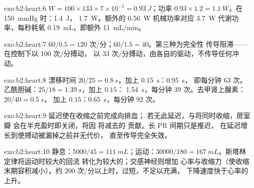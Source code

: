 \begin{solution}{exo:b2:heart:6}
$W = 100\times 133\times 7\times 10^{-5} = \qty{0.93}{J}$；功率
$0.93\times 1.2 = \qty{1.1}{W}$。在 \qty{150}{mmHg} 时：\qty{1.4}{J}，
\qty{1.7}{W}。额外的 \qty{0.56}{W} 机械功率对应
\qty{3.7}{W} 代谢功率，每秒耗氧 \qty{0.19}{mL}，即额外 \qty{11}{mL/min}。
\end{solution}

\begin{solution}{exo:b2:heart:7}
$60/0.5 = 120$ 次/分；$60/1.5 = 40$。第三种为完全性
传导阻滞——在控制下以 100 次/分搏动，
以 33 次/分搏动，由各自的驱动，不传导任何冲动。
\end{solution}

\begin{solution}{exo:b2:heart:8}
漂移时间 $20/25 = \qty{0.8}{s}$，加上 \qty{0.15}{s}：\qty{0.95}{s}，
即每分钟 63 次。乙酰胆碱：$25/18 = \qty{1.39}{s}$，加上 $0.15$：
\qty{1.54}{s}，每分钟 39 次。去甲肾上腺素：$20/40 = \qty{0.5}{s}$，
加上 $0.15$：\qty{0.65}{s}，每分钟 92 次。
\end{solution}

\begin{solution}{exo:b2:heart:9}
延迟使在收缩之前完成向排血；
若无此延迟，与将同时收缩，房室瓣
会在半充盈时即关闭，将因
将减去的
贡献。长 PR 间期只是推迟，
在延迟增长到使搏动被漏掉之前并无代价，
直至传导完全失效。
\end{solution}

\begin{solution}{exo:b2:heart:10}
静息：$5000/45 = \qty{111}{mL}$；运动：$\num{30000}/180 =
\qty{167}{mL}$。斯塔林定律将运动时较大的回流
转化为较大的；交感神经则增加
心率与收缩力（使收缩末期容积减小）。约
200 次/分以上时，过短，不足以充满，
下降速度快于心率的上升。
\end{solution}


